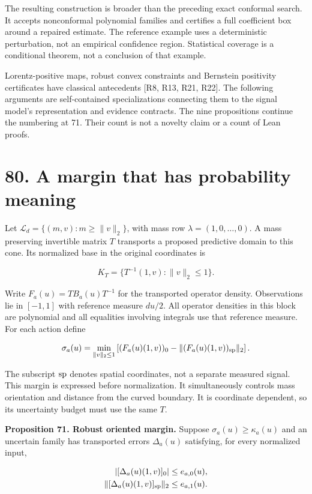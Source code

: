 \documentclass[11pt,letterpaper]{article}
\begin{document}
The resulting construction is broader than the preceding exact conformal
search. It accepts nonconformal polynomial families and certifies a full
coefficient box around a repaired estimate. The reference example uses a
deterministic perturbation, not an empirical confidence region.
Statistical coverage is a conditional theorem, not a conclusion of that
example.

Lorentz-positive maps, robust convex constraints and Bernstein
positivity certificates have classical antecedents {[}R8, R13, R21,
R22{]}. The following arguments are self-contained specializations
connecting them to the signal model's representation and evidence
contracts. The nine propositions continue the numbering at 71. Their
count is not a novelty claim or a count of Lean proofs.

\section{80. A margin that has probability
meaning}\label{a-margin-that-has-probability-meaning}

Let \(\mathcal L_d=\{(m,v):m\geq\|v\|_2\}\), with mass row
\(\lambda=(1,0,\ldots,0)\). A mass preserving invertible matrix \(T\)
transports a proposed predictive domain to this cone. Its normalized
base in the original coordinates is

\[
K_T=\{T^{-1}(1,v):\|v\|_2\leq1\}.
\]

Write \(F_a(u)=TB_a(u)T^{-1}\) for the transported operator density.
Observations lie in \([-1,1]\) with reference measure \(du/2\). All
operator densities in this block are polynomial and all equalities
involving integrals use that reference measure. For each action define

\[
\sigma_a(u)=\min_{\|v\|_2\leq1}
\left[(F_a(u)(1,v))_0-\|(F_a(u)(1,v))_{\rm sp}\|_2\right].
\]

The subscript \(\rm sp\) denotes spatial coordinates, not a separate
measured signal. This margin is expressed before normalization. It
simultaneously controls mass orientation and distance from the curved
boundary. It is coordinate dependent, so its uncertainty budget must use
the same \(T\).

\textbf{Proposition 71. Robust oriented margin.} Suppose
\(\sigma_a(u)\geq\kappa_a(u)\) and an uncertain family has transported
errors \(\Delta_a(u)\) satisfying, for every normalized input,

\[
\begin{aligned}
|[\Delta_a(u)(1,v)]_0|&\leq e_{a,0}(u),\\
\|[\Delta_a(u)(1,v)]_{\rm sp}\|_2&\leq e_{a,1}(u).
\end{aligned}
\]
\end{document}
